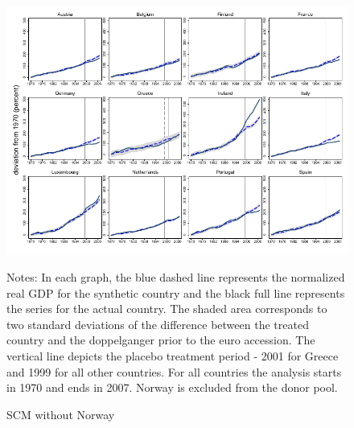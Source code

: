 \documentclass[12pt]{article}
\newcommand{\annote}[1]{\parbox{\textwidth}{\renewcommand{\baselinestretch}{1.0}\vspace{12pt} \small Notes: #1}}
\begin{document}
\begin{appendices}
\begin{figure}[h!]
    \centering
    \label{F_NOR}
    \caption{SCM without Norway}
    \includegraphics[scale=0.7]{Output/Figures/SCM_gdp_Rob_1999_Annual_NOR.pdf}
         \annote{In each graph, the blue dashed line represents the normalized real GDP for the synthetic country and the black full line represents the series for the actual country. The shaded area corresponds to two standard deviations of the difference between the treated country and the doppelganger prior to the euro accession. The vertical line depicts the placebo treatment period - 2001 for Greece and 1999 for all other countries. For all countries the analysis starts in 1970 and ends in 2007. Norway is excluded from the donor pool. }
\end{figure}


\end{appendices}
\end{document}
